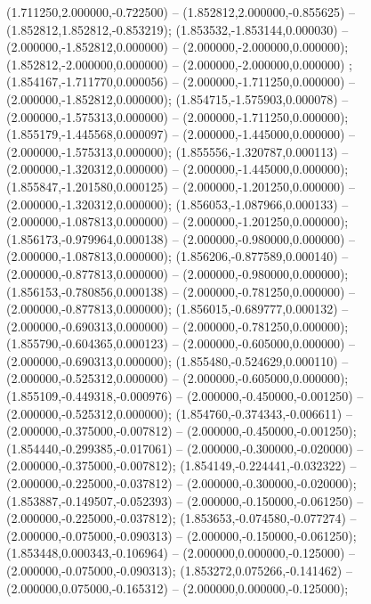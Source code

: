  (1.711250,2.000000,-0.722500) -- (1.852812,2.000000,-0.855625) -- (1.852812,1.852812,-0.853219);
 (1.853532,-1.853144,0.000030) -- (2.000000,-1.852812,0.000000) -- (2.000000,-2.000000,0.000000);
 (1.852812,-2.000000,0.000000) -- (2.000000,-2.000000,0.000000) ;
 (1.854167,-1.711770,0.000056) -- (2.000000,-1.711250,0.000000) -- (2.000000,-1.852812,0.000000);
 (1.854715,-1.575903,0.000078) -- (2.000000,-1.575313,0.000000) -- (2.000000,-1.711250,0.000000);
 (1.855179,-1.445568,0.000097) -- (2.000000,-1.445000,0.000000) -- (2.000000,-1.575313,0.000000);
 (1.855556,-1.320787,0.000113) -- (2.000000,-1.320312,0.000000) -- (2.000000,-1.445000,0.000000);
 (1.855847,-1.201580,0.000125) -- (2.000000,-1.201250,0.000000) -- (2.000000,-1.320312,0.000000);
 (1.856053,-1.087966,0.000133) -- (2.000000,-1.087813,0.000000) -- (2.000000,-1.201250,0.000000);
 (1.856173,-0.979964,0.000138) -- (2.000000,-0.980000,0.000000) -- (2.000000,-1.087813,0.000000);
 (1.856206,-0.877589,0.000140) -- (2.000000,-0.877813,0.000000) -- (2.000000,-0.980000,0.000000);
 (1.856153,-0.780856,0.000138) -- (2.000000,-0.781250,0.000000) -- (2.000000,-0.877813,0.000000);
 (1.856015,-0.689777,0.000132) -- (2.000000,-0.690313,0.000000) -- (2.000000,-0.781250,0.000000);
 (1.855790,-0.604365,0.000123) -- (2.000000,-0.605000,0.000000) -- (2.000000,-0.690313,0.000000);
 (1.855480,-0.524629,0.000110) -- (2.000000,-0.525312,0.000000) -- (2.000000,-0.605000,0.000000);
 (1.855109,-0.449318,-0.000976) -- (2.000000,-0.450000,-0.001250) -- (2.000000,-0.525312,0.000000);
 (1.854760,-0.374343,-0.006611) -- (2.000000,-0.375000,-0.007812) -- (2.000000,-0.450000,-0.001250);
 (1.854440,-0.299385,-0.017061) -- (2.000000,-0.300000,-0.020000) -- (2.000000,-0.375000,-0.007812);
 (1.854149,-0.224441,-0.032322) -- (2.000000,-0.225000,-0.037812) -- (2.000000,-0.300000,-0.020000);
 (1.853887,-0.149507,-0.052393) -- (2.000000,-0.150000,-0.061250) -- (2.000000,-0.225000,-0.037812);
 (1.853653,-0.074580,-0.077274) -- (2.000000,-0.075000,-0.090313) -- (2.000000,-0.150000,-0.061250);
 (1.853448,0.000343,-0.106964) -- (2.000000,0.000000,-0.125000) -- (2.000000,-0.075000,-0.090313);
 (1.853272,0.075266,-0.141462) -- (2.000000,0.075000,-0.165312) -- (2.000000,0.000000,-0.125000);
